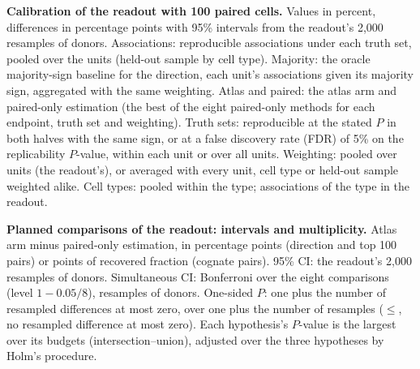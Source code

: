 \begin{table}[h]
\caption{\textbf{Calibration of the readout with 100 paired cells.} Values in percent, differences in percentage points with 95\% intervals from the readout's 2,000 resamples of donors. Associations: reproducible associations under each truth set, pooled over the \BoNUnits{} units (held-out sample by cell type). Majority: the oracle majority-sign baseline for the direction, each unit's associations given its majority sign, aggregated with the same weighting. Atlas and paired: the atlas arm and paired-only estimation (the best of the eight paired-only methods for each endpoint, truth set and weighting). Truth sets: reproducible at the stated $P$ in both halves with the same sign, or at a false discovery rate (FDR) of 5\% on the replicability $P$-value, within each unit or over all units. Weighting: pooled over units (the readout's), or averaged with every unit, cell type or held-out sample weighted alike. Cell types: pooled within the type; associations of the type in the readout.}
\label{tab:calibration}
\centering\footnotesize

\end{table}

\begin{table}[h]
\caption{\textbf{Planned comparisons of the readout: intervals and multiplicity.} Atlas arm minus paired-only estimation, in percentage points (direction and top 100 pairs) or points of recovered fraction (cognate pairs). 95\% CI: the readout's 2,000 resamples of donors. Simultaneous CI: Bonferroni over the eight comparisons (level $1-0.05/8$), \CbBoot{} resamples of donors. One-sided $P$: one plus the number of resampled differences at most zero, over one plus the number of resamples ($\leq$, no resampled difference at most zero). Each hypothesis's $P$-value is the largest over its budgets (intersection--union), adjusted over the three hypotheses by Holm's procedure.}
\label{tab:multiplicity}
\centering\footnotesize

\end{table}

